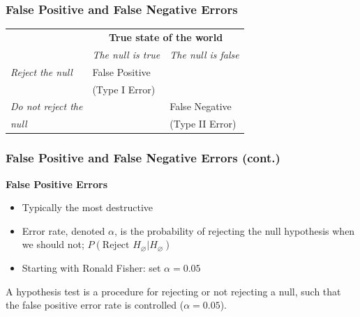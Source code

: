 \documentclass[12pt, block=fill]{beamer}
\begin{document}
\begin{frame}
  \frametitle{False Positive and False Negative Errors}
  \begin{center}
    \small
    \begin{tabular}{p{3cm}| p{3cm}| p{3cm}}
      & \multicolumn{2}{c}{\textbf{True state of the world}}  \\ 
      & \textit{The null is true} & \textit{The null is false} \\
      \hline \hline 
      \textit{Reject the null} & False Positive & \\
      & (Type I Error) & \\
      \hline 
      \textit{Do not reject the } & & False Negative\\
      \textit{null}&& (Type II Error)
    \end{tabular}
  \end{center}
\end{frame}

\begin{frame}
  \frametitle{False Positive and False Negative Errors (cont.)} 
  \textbf{False Positive Errors}
  \begin{itemize}
    \item Typically the most destructive
  \item Error rate, denoted $\alpha$, is the probability of rejecting
    the null hypothesis when we should not; $P(\text{Reject } H_\varnothing |
    H_\varnothing)$
  \item Starting with Ronald Fisher: set $\alpha = 0.05$
  \end{itemize} 
  
  A hypothesis test is a procedure for rejecting or not rejecting a
  null, such that the false positive error rate is controlled ($\alpha = 0.05$).
\end{frame}
\end{document}
